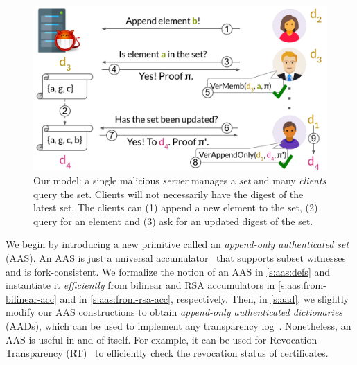 \newcommand{\figModel}{
\begin{figure}[t]
    \centering
    \includegraphics[width=.9\columnwidth]{figures-aad/model.pdf}
    \caption{
        Our model: a single malicious \textit{server} manages a \textit{set} and many \textit{clients} query the set.
        Clients will not necessarily have the digest of the latest set.
        The clients can (1) append a new element to the set, (2) query for an element and (3) ask for an updated digest of the set.
    }
    \label{f:model}
\end{figure}
}

\figModel

We begin by introducing a new primitive called an \textit{append-only authenticated set} (AAS).
An AAS is just a universal accumulator~\cite{LLX07} that supports subset witnesses and is fork-consistent.
We formalize the notion of an AAS in \cref{s:aas:defs} and instantiate it \textit{efficiently} from bilinear and RSA accumulators in \cref{s:aas:from-bilinear-acc} and in \cref{s:aas:from-rsa-acc}, respectively.
Then, in \cref{s:aad}, we slightly modify our AAS constructions to obtain \textit{append-only authenticated dictionaries} (AADs), which can be used to implement any transparency log~\cite{ELC16}.
Nonetheless, an AAS is useful in and of itself.
For example, it can be used for Revocation Transparency (RT)~\cite{Laurie15} to efficiently check the revocation status of certificates.

